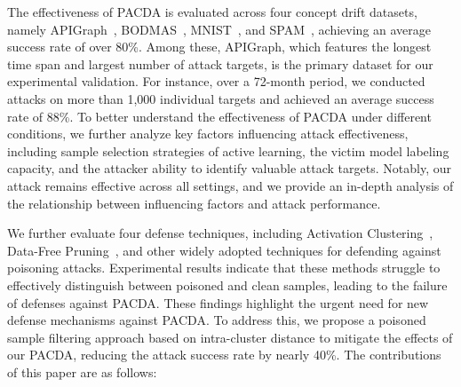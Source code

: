 \documentclass[conference,compsoc]{IEEEtran} %
\begin{document}

The effectiveness of PACDA is evaluated across four concept drift datasets, namely APIGraph~\cite{2020-CCS-APIGraph}, BODMAS~\cite{2021-PE-malware-dataset}, MNIST~\cite{2017-MINIST-dataset}, and SPAM~\cite{2010-Spam-Emali-dataset}, achieving an average success rate of over 80\%.
Among these, APIGraph, which features the longest time span and largest number of attack targets, is the primary dataset for our experimental validation.
For instance, over a 72-month period, we conducted attacks on more than 1,000 individual targets and achieved an average success rate of 88\%.
To better understand the effectiveness of PACDA under different conditions, we further analyze key factors influencing attack effectiveness, including sample selection strategies of active learning, the victim model  labeling capacity, and the attacker  ability to identify valuable attack targets.
Notably, our attack remains effective across all settings, and we provide an in-depth analysis of the relationship between influencing factors and attack performance.

We further evaluate four defense techniques, including Activation Clustering~\cite{AC}, Data-Free Pruning~\cite{DFP}, and other widely adopted techniques for defending against poisoning attacks.
Experimental results indicate that these methods struggle to effectively distinguish between poisoned and clean samples, leading to the failure of defenses against PACDA.
These findings highlight the urgent need for new defense mechanisms against PACDA.
To address this, we propose a poisoned sample filtering approach based on intra-cluster distance to mitigate the effects of our PACDA, reducing the attack success rate by nearly 40\%. The contributions of this paper are as follows:
\end{document}
